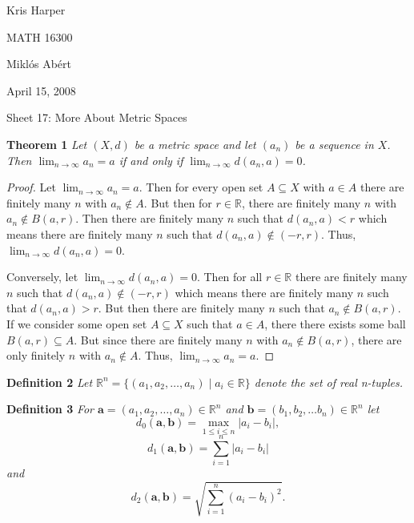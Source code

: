 \documentclass{article}
\begin{document}
\begin{flushright}
Kris Harper

MATH 16300

Mikl\'{o}s Ab\'{e}rt

April 15, 2008
\end{flushright}

\begin{flushleft}

\Large

Sheet 17: More About Metric Spaces\newline

\normalsize

\textbf{Theorem 1}
\textsl{Let $(X,d)$ be a metric space and let $(a_n)$ be a sequence in $X$. Then $\lim_{n \rightarrow \infty} a_n = a$ if and only if $\lim_{n \rightarrow \infty} d(a_n,a) = 0$.}
\begin{proof}
Let $\lim_{n \rightarrow \infty} a_n = a$. Then for every open set $A \subseteq X$ with $a \in A$ there are finitely many $n$ with $a_n \notin A$. But then for $r \in \mathbb{R}$, there are finitely many $n$ with $a_n \notin B(a,r)$. Then there are finitely many $n$ such that $d(a_n,a) < r$ which means there are finitely many $n$ such that $d(a_n,a) \notin (-r,r)$. Thus, $\lim_{n \rightarrow \infty} d(a_n,a) = 0$.\newline

Conversely, let $\lim_{n \rightarrow \infty} d(a_n,a) = 0$. Then for all $r \in \mathbb{R}$ there are finitely many $n$ such that $d(a_n,a) \notin (-r,r)$ which means there are finitely many $n$ such that $d(a_n,a) > r$. But then there are finitely many $n$ such that $a_n \notin B(a,r)$. If we consider some open set $A \subseteq X$ such that $a \in A$, there there exists some ball $B(a,r) \subseteq A$. But since there are finitely many $n$ with $a_n \notin B(a,r)$, there are only finitely $n$ with $a_n \notin A$. Thus, $\lim_{n \rightarrow \infty} a_n = a$.
\end{proof}

\textbf{Definition 2}
\textsl{Let $\mathbb{R}^n = \{(a_1, a_2, \dots ,a_n) \mid a_i \in \mathbb{R}\}$ denote the set of real n-tuples.}\newline

\textbf{Definition 3}
\textsl{For $\mathbf{a} = (a_1, a_2, \dots ,a_n) \in \mathbb{R}^n$ and $\mathbf{b} = (b_1,b_2, \dots b_n) \in \mathbb{R}^n$ let
\[
d_{0} (\mathbf{a},\mathbf{b}) = \max_{1 \leq i \leq n} |a_i - b_i|,
\]
\[
d_{1} (\mathbf{a}, \mathbf{b}) = \sum_{i=1}^{n} |a_i - b_i|
\]
and
\[
d_{2} (\mathbf{a}, \mathbf{b}) = \sqrt{\sum_{i=1}^{n} (a_i-b_i)^2}.
\]}\newline


\end{flushleft}
\end{document}

